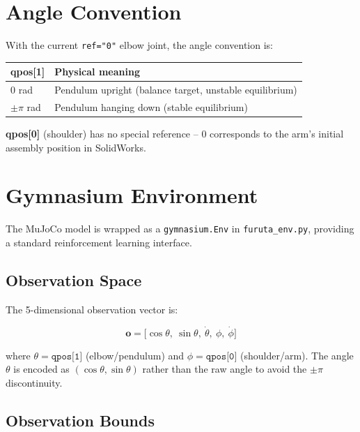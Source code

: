 \documentclass[12pt,a4paper]{article}
\begin{document}
\section{Angle Convention}

With the current \texttt{ref="0"} elbow joint, the angle convention is:

\begin{center}
\begin{tabular}{ll}
\toprule
\textbf{qpos[1]} & \textbf{Physical meaning} \\
\midrule
$0$ rad & Pendulum upright (balance target, unstable equilibrium) \\
$\pm\pi$ rad & Pendulum hanging down (stable equilibrium) \\
\bottomrule
\end{tabular}
\end{center}

\noindent \textbf{qpos[0]} (shoulder) has no special reference -- $0$ corresponds to the arm's initial assembly position in SolidWorks.

\section{Gymnasium Environment}

The MuJoCo model is wrapped as a \texttt{gymnasium.Env} in \texttt{furuta\_env.py},
providing a standard reinforcement learning interface.

\subsection{Observation Space}

The 5-dimensional observation vector is:

\begin{equation}
\mathbf{o} = \bigl[\cos\theta,\ \sin\theta,\ \dot\theta,\ \phi,\ \dot\phi\bigr]
\end{equation}

\noindent where $\theta = \texttt{qpos[1]}$ (elbow/pendulum) and
$\phi = \texttt{qpos[0]}$ (shoulder/arm).
The angle $\theta$ is encoded as $(\cos\theta, \sin\theta)$ rather than the raw
angle to avoid the $\pm\pi$ discontinuity.

\subsection{Observation Bounds}
\end{document}
